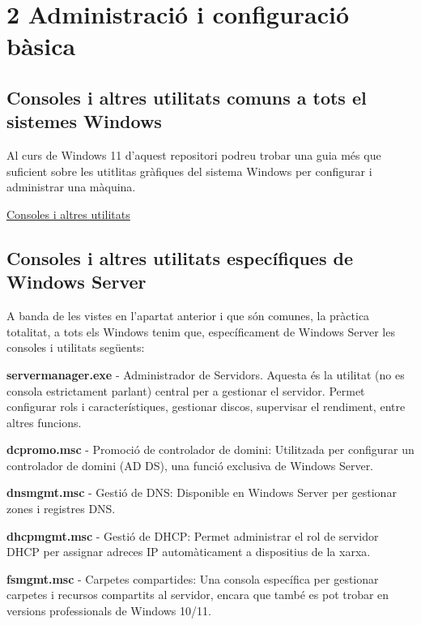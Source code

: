 \documentclass[
  a4paper,
]{article}
\begin{document}
\section{2 Administració i configuració
bàsica}\label{administraciuxf3-i-configuraciuxf3-buxe0sica}

\subsection{Consoles i altres utilitats comuns a tots el sistemes
Windows}\label{consoles-i-altres-utilitats-comuns-a-tots-el-sistemes-windows}

Al curs de Windows 11 d'aquest repositori podreu trobar una guia més que
suficient sobre les utitlitas gràfiques del sistema Windows per
configurar i administrar una màquina.

\href{https://tofermos.github.io/Windows11/gestiodelequip/gestiodelequip.html}{Consoles
i altres utilitats}

\subsection{Consoles i altres utilitats específiques de Windows
Server}\label{consoles-i-altres-utilitats-especuxedfiques-de-windows-server}

A banda de les vistes en l'apartat anterior i que són comunes, la
pràctica totalitat, a tots els Windows tenim que, específicament de
Windows Server les consoles i utilitats següents:

\textbf{servermanager.exe} - Administrador de Servidors. Aquesta és la
utilitat (no es consola estrictament parlant) central per a gestionar el
servidor. Permet configurar rols i característiques, gestionar discos,
supervisar el rendiment, entre altres funcions.

\textbf{dcpromo.msc} - Promoció de controlador de domini: Utilitzada per
configurar un controlador de domini (AD DS), una funció exclusiva de
Windows Server.

\textbf{dnsmgmt.msc} - Gestió de DNS: Disponible en Windows Server per
gestionar zones i registres DNS.

\textbf{dhcpmgmt.msc} - Gestió de DHCP: Permet administrar el rol de
servidor DHCP per assignar adreces IP automàticament a dispositius de la
xarxa.

\textbf{fsmgmt.msc} - Carpetes compartides: Una consola específica per
gestionar carpetes i recursos compartits al servidor, encara que també
es pot trobar en versions professionals de Windows 10/11.
\end{document}
